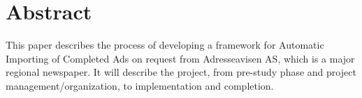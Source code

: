  
 
 
 
 
 
 
 
 
 
 

%

\section{Abstract}

This paper describes the process of developing a framework for Automatic Importing of Completed Ads on request from Adresseavisen AS, which is a major regional newspaper. It will describe the project, from pre-study phase and project management/organization, to implementation and completion.

